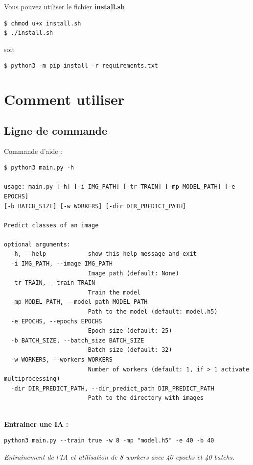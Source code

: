 Vous pouvez utiliser le fichier \textbf{install.sh}

\begin{verbatim}
$ chmod u+x install.sh
$ ./install.sh
\end{verbatim}
soit

\begin{verbatim}
$ python3 -m pip install -r requirements.txt
\end{verbatim}


\section{Comment utiliser}

\subsection{Ligne de commande}

Commande d'aide : \\
\begin{verbatim}
$ python3 main.py -h

usage: main.py [-h] [-i IMG_PATH] [-tr TRAIN] [-mp MODEL_PATH] [-e EPOCHS] 
[-b BATCH_SIZE] [-w WORKERS] [-dir DIR_PREDICT_PATH]

Predict classes of an image

optional arguments:
  -h, --help            show this help message and exit
  -i IMG_PATH, --image IMG_PATH
                        Image path (default: None)
  -tr TRAIN, --train TRAIN
                        Train the model
  -mp MODEL_PATH, --model_path MODEL_PATH
                        Path to the model (default: model.h5)
  -e EPOCHS, --epochs EPOCHS
                        Epoch size (default: 25)
  -b BATCH_SIZE, --batch_size BATCH_SIZE
                        Batch size (default: 32)
  -w WORKERS, --workers WORKERS
                        Number of workers (default: 1, if > 1 activate multiprocessing)
  -dir DIR_PREDICT_PATH, --dir_predict_path DIR_PREDICT_PATH
                        Path to the directory with images
\end{verbatim}
\\
\textbf{Entrainer une IA :}

\begin{verbatim}
python3 main.py --train true -w 8 -mp "model.h5" -e 40 -b 40
\end{verbatim}

\textit{Entrainement de l'IA et utilisation de 8 workers avec 40 epochs et 40 batchs.
} \\

